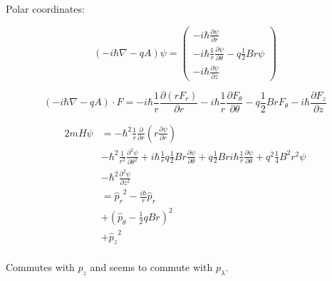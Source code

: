 \documentclass[12pt, a4paper]{article}
\begin{document}
\begin{comment}
Second separation: $C(r, \theta) = R(r) \Theta(\theta)$:

$$-\hbar^2 
\left( 
{1 \over r} \frac{1}{R(r) \Theta(\theta)} \Theta(\theta) {\partial \over \partial r} \left(r {\partial R \over \partial r}\right)
+ {1 \over r^2} \frac{1}{R(r) \Theta(\theta)} R(r) {\partial^2 \Theta \over \partial \theta^2}
\right) 
 + i q \hbar \frac{1}{2} B  \frac{1}{R(r) \Theta(\theta)} R(r) \frac{\partial \Theta}{\partial \theta} + q^2 \frac{1}{4} B^2 r^2 = E_{r\theta}$$

$$\begin{cases}

\end{cases}$$

\end{comment}

Polar coordinates:

$$\renewcommand\arraystretch{1.5}
(-i \hbar \nabla - q A) \psi =
\begin{pmatrix}
-i \hbar \frac{\partial \psi}{\partial r} \\
-i \hbar \frac{1}{r} \frac{\partial \psi}{\partial \theta} - q \frac{1}{2} B r \psi  \\
-i \hbar \frac{\partial \psi}{\partial z} 
\end{pmatrix}
$$

$$
(-i \hbar \nabla - qA) \cdot F =
-i \hbar \frac{1}{r} \frac{\partial (r F_r)}{\partial r}
-i \hbar  \frac{1}{r} \frac{\partial F_\theta}{\partial \theta} - q \frac{1}{2} B r F_\theta
-i \hbar  \frac{\partial F_z}{\partial z}
$$

\begin{align*}
2 m H \psi
&= - \hbar^2 \frac{1}{r} \frac{\partial}{\partial r} \left( r \frac{\partial \psi}{\partial r}\right ) \\
&- \hbar^2 \frac{1}{r^2} \frac{\partial^2 \psi}{\partial \theta^2} + i \hbar \frac{1}{r} q \frac{1}{2} B r \frac{\partial \psi}{\partial \theta} + q \frac{1}{2} B r i \hbar \frac{1}{r} \frac{\partial \psi}{\partial \theta} + q^2 \frac{1}{4} B^2 r^2 \psi \\
&- \hbar^2 \frac{\partial^2 \psi}{\partial z^2} \\
&= {\hat p_r}^2 - \frac{i \hbar}{r} {\hat p_r} \\
&+ ({\hat p_\theta} - \frac{1}{2} q B r)^2\\
&+ {\hat p_z}^2 \\
\end{align*}

Commutes with $p_z$ and seems to commute with $p_\lambda$.
\end{document}
